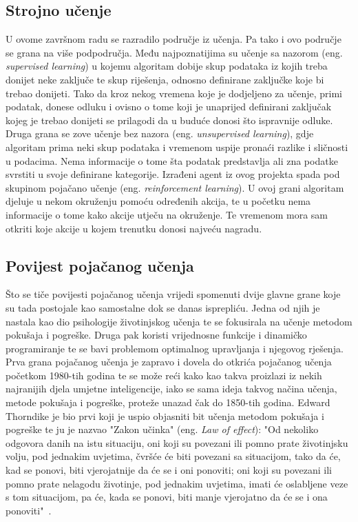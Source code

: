\subsection{Strojno učenje}
U ovome završnom radu se razradilo područje iz učenja. Pa tako i ovo područje se grana na više podpodručja. Među najpoznatijima su učenje sa nazorom (eng. \textit{supervised learning}) u kojemu algoritam dobije skup podataka iz kojih treba donijet neke zaključe te skup riješenja, odnosno definirane zaključke koje bi trebao donijeti. Tako da kroz nekog vremena koje je dodjeljeno za učenje, primi podatak, donese odluku i ovisno 
o tome koji je unaprijed definirani zaključak kojeg je trebao donijeti se prilagodi da u buduće donosi što ispravnije odluke. Druga grana se zove učenje bez nazora (eng. \textit{unsupervised learning}), gdje algoritam prima neki skup podataka i vremenom uspije pronaći razlike i sličnosti u podacima. Nema informacije o tome šta podatak predstavlja ali zna podatke svrstiti u svoje definirane kategorije. Izrađeni agent iz ovog projekta spada pod skupinom pojačano učenje (eng. \textit{reinforcement learning}). U ovoj grani algoritam djeluje u nekom okruženju pomoću određenih akcija, te u početku nema informacije o tome kako akcije utječu na okruženje. Te vremenom mora sam otkriti koje akcije u kojem trenutku donosi najveću nagradu.


\subsection{Povijest pojačanog učenja}
Što se tiče povijesti pojačanog učenja vrijedi spomenuti dvije glavne grane koje su tada postojale kao samostalne dok se danas isprepliću. Jedna od njih je nastala kao dio psihologije životinjskog učenja te se fokusirala na učenje metodom pokušaja i pogreške. Druga pak koristi vrijednosne funkcije i dinamičko programiranje te se bavi problemom optimalnog upravljanja i njegovog rješenja. Prva grana pojačanog učenja je zapravo i dovela do otkrića pojačanog učenja početkom 1980-tih godina te se može reći kako kao takva proizlazi iz nekih najranijih djela umjetne inteligencije, iako se sama ideja takvog načina učenja, metode pokušaja i pogreške, proteže unazad čak do 1850-tih godina. Edward Thorndike je bio prvi koji je uspio objasniti bit učenja metodom pokušaja i pogreške te ju je nazvao "Zakon učinka" (eng. \textit{Law of effect}): "Od nekoliko odgovora danih na istu situaciju, oni koji su povezani ili pomno prate životinjsku volju, pod jednakim uvjetima, čvršće će biti povezani sa situacijom, tako da će, kad se ponovi, biti vjerojatnije da će se i oni ponoviti; oni koji su povezani ili pomno prate nelagodu životinje, pod jednakim uvjetima, imati će oslabljene veze s tom situacijom, pa će, kada se ponovi, biti manje vjerojatno da će se i ona ponoviti"~\cite{reinforcement_learning}.

